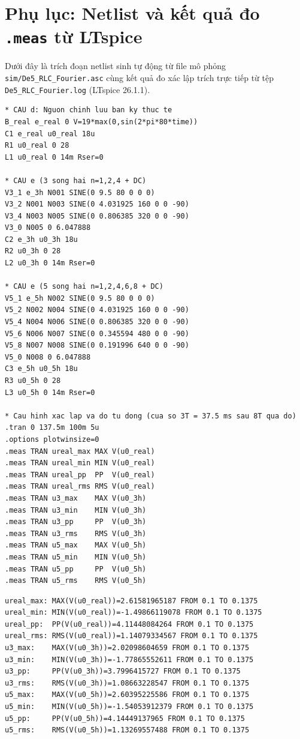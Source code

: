 \clearpage
\appendix
\section{Phụ lục: Netlist và kết quả đo \texttt{.meas} từ LTspice}

Dưới đây là trích đoạn netlist sinh tự động từ file mô phỏng \texttt{sim/De5\_RLC\_Fourier.asc} cùng kết quả đo xác lập trích trực tiếp từ tệp \texttt{De5\_RLC\_Fourier.log} (LTspice 26.1.1).

\begin{lstlisting}[caption={Trích đoạn netlist và câu lệnh mô phỏng trong \texttt{De5\_RLC\_Fourier.asc}.}]
* CAU d: Nguon chinh luu ban ky thuc te
B_real e_real 0 V=19*max(0,sin(2*pi*80*time))
C1 e_real u0_real 18u
R1 u0_real 0 28
L1 u0_real 0 14m Rser=0

* CAU e (3 song hai n=1,2,4 + DC)
V3_1 e_3h N001 SINE(0 9.5 80 0 0 0)
V3_2 N001 N003 SINE(0 4.031925 160 0 0 -90)
V3_4 N003 N005 SINE(0 0.806385 320 0 0 -90)
V3_0 N005 0 6.047888
C2 e_3h u0_3h 18u
R2 u0_3h 0 28
L2 u0_3h 0 14m Rser=0

* CAU e (5 song hai n=1,2,4,6,8 + DC)
V5_1 e_5h N002 SINE(0 9.5 80 0 0 0)
V5_2 N002 N004 SINE(0 4.031925 160 0 0 -90)
V5_4 N004 N006 SINE(0 0.806385 320 0 0 -90)
V5_6 N006 N007 SINE(0 0.345594 480 0 0 -90)
V5_8 N007 N008 SINE(0 0.191996 640 0 0 -90)
V5_0 N008 0 6.047888
C3 e_5h u0_5h 18u
R3 u0_5h 0 28
L3 u0_5h 0 14m Rser=0

* Cau hinh xac lap va do tu dong (cua so 3T = 37.5 ms sau 8T qua do)
.tran 0 137.5m 100m 5u
.options plotwinsize=0
.meas TRAN ureal_max MAX V(u0_real)
.meas TRAN ureal_min MIN V(u0_real)
.meas TRAN ureal_pp  PP  V(u0_real)
.meas TRAN ureal_rms RMS V(u0_real)
.meas TRAN u3_max    MAX V(u0_3h)
.meas TRAN u3_min    MIN V(u0_3h)
.meas TRAN u3_pp     PP  V(u0_3h)
.meas TRAN u3_rms    RMS V(u0_3h)
.meas TRAN u5_max    MAX V(u0_5h)
.meas TRAN u5_min    MIN V(u0_5h)
.meas TRAN u5_pp     PP  V(u0_5h)
.meas TRAN u5_rms    RMS V(u0_5h)
\end{lstlisting}

\begin{lstlisting}[caption={Kết quả đo tự động trích từ tệp \texttt{De5\_RLC\_Fourier.log} (LTspice 26.1.1).}]
ureal_max: MAX(V(u0_real))=2.61581965187 FROM 0.1 TO 0.1375
ureal_min: MIN(V(u0_real))=-1.49866119078 FROM 0.1 TO 0.1375
ureal_pp:  PP(V(u0_real))=4.11448084264 FROM 0.1 TO 0.1375
ureal_rms: RMS(V(u0_real))=1.14079334567 FROM 0.1 TO 0.1375
u3_max:    MAX(V(u0_3h))=2.02098604659 FROM 0.1 TO 0.1375
u3_min:    MIN(V(u0_3h))=-1.77865552611 FROM 0.1 TO 0.1375
u3_pp:     PP(V(u0_3h))=3.7996415727 FROM 0.1 TO 0.1375
u3_rms:    RMS(V(u0_3h))=1.08663228547 FROM 0.1 TO 0.1375
u5_max:    MAX(V(u0_5h))=2.60395225586 FROM 0.1 TO 0.1375
u5_min:    MIN(V(u0_5h))=-1.54053912379 FROM 0.1 TO 0.1375
u5_pp:     PP(V(u0_5h))=4.14449137965 FROM 0.1 TO 0.1375
u5_rms:    RMS(V(u0_5h))=1.13269557488 FROM 0.1 TO 0.1375
\end{lstlisting}
